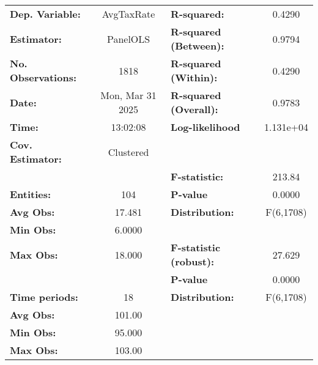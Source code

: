 \begin{center}
\begin{tabular}{lclc}
\toprule
\textbf{Dep. Variable:}              &     AvgTaxRate     & \textbf{  R-squared:         }   &      0.4290      \\
\textbf{Estimator:}                  &      PanelOLS      & \textbf{  R-squared (Between):}  &      0.9794      \\
\textbf{No. Observations:}           &        1818        & \textbf{  R-squared (Within):}   &      0.4290      \\
\textbf{Date:}                       &  Mon, Mar 31 2025  & \textbf{  R-squared (Overall):}  &      0.9783      \\
\textbf{Time:}                       &      13:02:08      & \textbf{  Log-likelihood     }   &    1.131e+04     \\
\textbf{Cov. Estimator:}             &     Clustered      & \textbf{                     }   &                  \\
\textbf{}                            &                    & \textbf{  F-statistic:       }   &      213.84      \\
\textbf{Entities:}                   &        104         & \textbf{  P-value            }   &      0.0000      \\
\textbf{Avg Obs:}                    &       17.481       & \textbf{  Distribution:      }   &    F(6,1708)     \\
\textbf{Min Obs:}                    &       6.0000       & \textbf{                     }   &                  \\
\textbf{Max Obs:}                    &       18.000       & \textbf{  F-statistic (robust):} &      27.629      \\
\textbf{}                            &                    & \textbf{  P-value            }   &      0.0000      \\
\textbf{Time periods:}               &         18         & \textbf{  Distribution:      }   &    F(6,1708)     \\
\textbf{Avg Obs:}                    &       101.00       & \textbf{                     }   &                  \\
\textbf{Min Obs:}                    &       95.000       & \textbf{                     }   &                  \\
\textbf{Max Obs:}                    &       103.00       & \textbf{                     }   &                  \\

\end{tabular}
\end{center}
